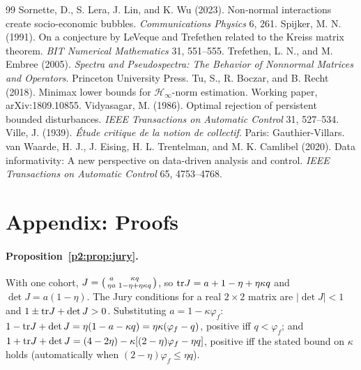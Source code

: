 \begin{thebibliography}{99}
 Sornette, D., S. Lera, J. Lin, and K. Wu (2023). Non-normal interactions create socio-economic bubbles. \emph{Communications Physics} 6, 261.
 Spijker, M. N. (1991). On a conjecture by LeVeque and Trefethen related to the Kreiss matrix theorem. \emph{BIT Numerical Mathematics} 31, 551--555.
 Trefethen, L. N., and M. Embree (2005). \emph{Spectra and Pseudospectra: The Behavior of Nonnormal Matrices and Operators}. Princeton University Press.
 Tu, S., R. Boczar, and B. Recht (2018). Minimax lower bounds for $\mathcal H_\infty$-norm estimation. Working paper, arXiv:1809.10855.
 Vidyasagar, M. (1986). Optimal rejection of persistent bounded disturbances. \emph{IEEE Transactions on Automatic Control} 31, 527--534.
 Ville, J. (1939). \emph{\'Etude critique de la notion de collectif}. Paris: Gauthier-Villars.
 van Waarde, H. J., J. Eising, H. L. Trentelman, and M. K. Camlibel (2020). Data informativity: A new perspective on data-driven analysis and control. \emph{IEEE Transactions on Automatic Control} 65, 4753--4768.
\end{thebibliography}

\section{Appendix: Proofs}\label{p2:app:proofs}

\paragraph{Proposition~\ref{p2:prop:jury}.} With one cohort, $J=\begin{psmallmatrix}a&\kappa q\\ \eta a&1-\eta+\eta\kappa q\end{psmallmatrix}$, so ${\rm tr}J=a+1-\eta+\eta\kappa q$ and $\det J=a(1-\eta)$. The Jury conditions for a real $2\times2$ matrix are $|\det J|<1$ and $1\pm{\rm tr}J+\det J>0$. Substituting $a=1-\kappa\varphi_f$: $1-{\rm tr}J+\det J=\eta(1-a-\kappa q)=\eta\kappa(\varphi_f-q)$, positive iff $q<\varphi_f$; and $1+{\rm tr}J+\det J=(4-2\eta)-\kappa[(2-\eta)\varphi_f-\eta q]$, positive iff the stated bound on $\kappa$ holds (automatically when $(2-\eta)\varphi_f\le\eta q$).

